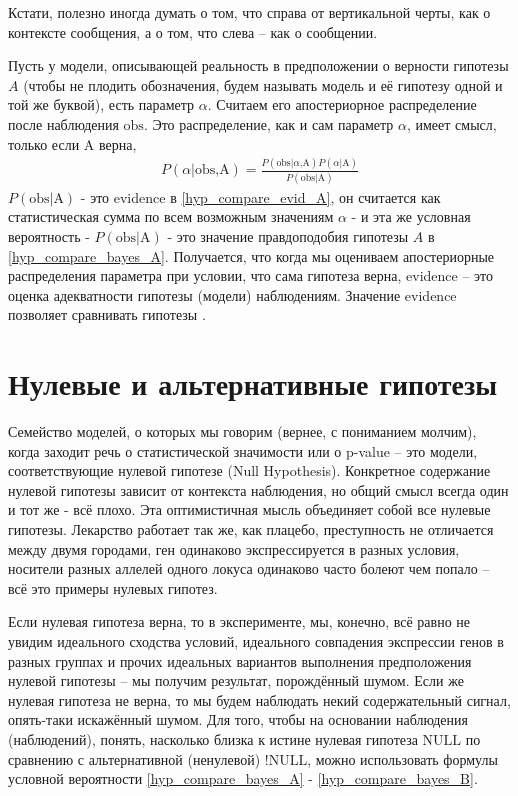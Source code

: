 \documentclass{book}
\begin{document}
 Кстати, полезно иногда думать о том, что справа от вертикальной черты, как о контексте сообщения, а о том, что слева -- как о сообщении. 
 
 Пусть у модели, описывающей реальность в предположении о верности гипотезы $A$ (чтобы не плодить обозначения, будем называть модель и её гипотезу одной и той же буквой),  есть параметр $\alpha$. Считаем его апостериорное распределение после наблюдения $\text{obs}$. Это распределение, как и сам параметр $\alpha$, имеет смысл, только если $\text{A}$ верна,
\begin{align}\label{hyp_compare_evid_A}
   P\left(\alpha\text{|obs,A}\right)=\frac{P\left(\text{obs|}\alpha\text{,A}\right) P\left(\alpha\text{|A}\right)}{P\left(\text{obs|A}\right)}
\end{align}
$P\left(\text{obs|A}\right)$ - это evidence в \eqref{hyp_compare_evid_A}, он считается как статистическая сумма по всем возможным значениям $\alpha$ - и эта же условная вероятность - $P\left(\text{obs|A}\right)$ - это значение правдоподобия гипотезы $A$ в \eqref{hyp_compare_bayes_A}. Получается, что когда мы оцениваем апостериорные распределения параметра при условии, что сама гипотеза верна, evidence -- это оценка адекватности гипотезы (модели) наблюдениям. Значение evidence позволяет сравнивать гипотезы \citep[подробнее см.][]{skilling_nested_2006}.

\section*{Нулевые и альтернативные гипотезы}

Семейство моделей, о которых мы говорим (вернее, с пониманием молчим), когда заходит речь о статистической значимости или о p-value -- это модели, соответствующие нулевой гипотезе (Null Hypothesis). Конкретное содержание нулевой гипотезы зависит от контекста наблюдения, но общий смысл всегда один и тот же - всё плохо. Эта оптимистичная мысль объединяет собой все нулевые гипотезы. Лекарство работает так же, как плацебо, преступность не отличается между двумя городами, ген одинаково экспрессируется в разных условия, носители разных аллелей одного локуса одинаково часто болеют чем попало -- всё это примеры нулевых гипотез. 

Если нулевая гипотеза верна, то в эксперименте, мы, конечно, всё равно не увидим идеального сходства условий, идеального совпадения экспрессии генов в разных группах и прочих идеальных вариантов выполнения предположения нулевой гипотезы -- мы получим результат, порождённый шумом. Если же нулевая гипотеза не верна, то мы будем наблюдать некий содержательный сигнал, опять-таки искажённый шумом. Для того, чтобы на основании наблюдения (наблюдений), понять, насколько близка к истине нулевая гипотеза $\text{NULL}$ по сравнению с альтернативной (ненулевой) $\text{!NULL}$, можно использовать формулы условной вероятности \eqref{hyp_compare_bayes_A} - \eqref{hyp_compare_bayes_B}. 
\end{document}
